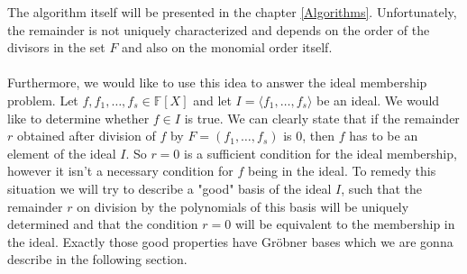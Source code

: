 \documentclass[thesis=M,english]{FITthesis}[2012/10/20]
\theoremstyle{remark}
\theoremstyle{definition}
\begin{document}
\noindent The algorithm itself will be presented in the chapter \ref{Algorithms}. Unfortunately,  the remainder is not uniquely characterized and depends on the order of the divisors in the set $F$ and also on the monomial order itself. \\ \\
\noindent Furthermore, we would like to use this idea to answer the ideal membership problem. Let $f, f_1, \ldots, f_s \in \mathbb{F}[X]$ and let $I = \langle f_1, \ldots, f_s \rangle$ be an ideal. We would like to determine whether $f \in I$ is true. We can clearly state that if the remainder $r$ obtained after division of $f$ by $F = (f_1, \ldots, f_s)$ is $0$, then $f$ has to be an element of the ideal $I$. So $r=0$ is a sufficient condition for the ideal membership, however it isn't a necessary condition for $f$ being in the ideal. To remedy this situation we will try to describe a "good" basis of the ideal $I$, such that the remainder $r$ on division by the polynomials of this basis will be uniquely determined and that the condition $r=0$ will be equivalent to the membership in the ideal. Exactly those good properties have Gröbner bases which we are gonna describe in the following section.
\end{document}
